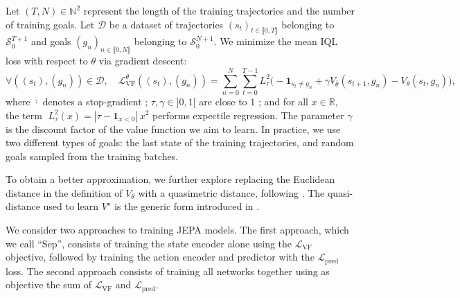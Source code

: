 Let $(T, N) \in \mathbb{N}^2$ represent the length of the training trajectories and the number of training goals. Let $\mathcal{D}$ be a dataset of trajectories $(s_t)_{t\in\llbracket0,T\rrbracket}$ belonging to $\mathcal{S}_0^{T+1}$ and goals $(g_n)_{n\in\llbracket0,N\rrbracket}$  belonging to $\mathcal{S}_0^{N+1}$. We minimize the mean IQL loss with respect to $\theta$ via gradient descent:
\begin{equation}
\forall ((s_t),(g_n)) \in \mathcal{D}, \quad
\mathcal{L}_\text{VF}^\theta((s_t),(g_n)) = \sum_{n=0}^N \sum_{t=0}^{T-1} 
L_\tau^2 \Big( -\mathbf{1}_{s_t \neq g_n} + \gamma V_{\bar{\theta}}(s_{t+1}, g_n) - V_\theta(s_t, g_n) \Big),
\end{equation}
where $\bar{\cdot}$ denotes a stop-gradient ; $\tau, \gamma \in ]0,1[$ are close to $1$ ; and for all $x \in \mathbb{R},$ the term \mbox{$\; L_\tau^2(x) = |\tau - \mathbf{1}_{x<0}| \, x^2$} performs expectile regression. The parameter $\gamma$ is the discount factor of the value function we aim to learn.
In practice, we use two different types of goals: the last state of the training trajectories, and random goals sampled from the training batches.

To obtain a better approximation, we further explore replacing the Euclidean distance in the definition of $V_\theta$ with a quasimetric distance, following \cite{wang2023optimalgoalreachingreinforcementlearning}. The quasi-distance used to learn $V^\star$ is the generic form introduced in \cite{wang2022improved}.

We consider two approaches to training JEPA models. The first approach, which we call ``Sep'', consists of training the state encoder alone using the $\mathcal{L}_\text{VF}$ objective, followed by training the action encoder and predictor with the $\mathcal{L}_\text{pred}$ loss. The second approach consists of training all networks together using as objective the sum of $\mathcal{L}_\text{VF}$ and $\mathcal{L}_\text{pred}$.